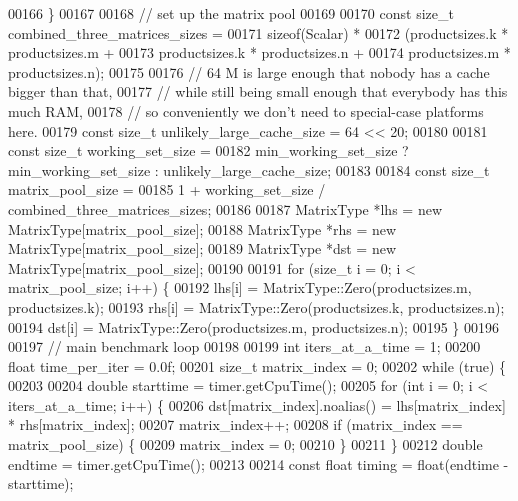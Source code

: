 \begin{DoxyCode}
00166   \}
00167 
00168   \textcolor{comment}{// set up the matrix pool}
00169 
00170   \textcolor{keyword}{const} \textcolor{keywordtype}{size\_t} combined\_three\_matrices\_sizes =
00171     \textcolor{keyword}{sizeof}(Scalar) *
00172       (productsizes.k * productsizes.m +
00173        productsizes.k * productsizes.n +
00174        productsizes.m * productsizes.n);
00175 
00176   \textcolor{comment}{// 64 M is large enough that nobody has a cache bigger than that,}
00177   \textcolor{comment}{// while still being small enough that everybody has this much RAM,}
00178   \textcolor{comment}{// so conveniently we don't need to special-case platforms here.}
00179   \textcolor{keyword}{const} \textcolor{keywordtype}{size\_t} unlikely\_large\_cache\_size = 64 << 20;
00180 
00181   \textcolor{keyword}{const} \textcolor{keywordtype}{size\_t} working\_set\_size =
00182     min\_working\_set\_size ? min\_working\_set\_size : unlikely\_large\_cache\_size;
00183 
00184   \textcolor{keyword}{const} \textcolor{keywordtype}{size\_t} matrix\_pool\_size =
00185     1 + working\_set\_size / combined\_three\_matrices\_sizes;
00186 
00187   MatrixType *lhs = \textcolor{keyword}{new} MatrixType[matrix\_pool\_size];
00188   MatrixType *rhs = \textcolor{keyword}{new} MatrixType[matrix\_pool\_size];
00189   MatrixType *dst = \textcolor{keyword}{new} MatrixType[matrix\_pool\_size];
00190   
00191   \textcolor{keywordflow}{for} (\textcolor{keywordtype}{size\_t} i = 0; i < matrix\_pool\_size; i++) \{
00192     lhs[i] = MatrixType::Zero(productsizes.m, productsizes.k);
00193     rhs[i] = MatrixType::Zero(productsizes.k, productsizes.n);
00194     dst[i] = MatrixType::Zero(productsizes.m, productsizes.n);
00195   \}
00196 
00197   \textcolor{comment}{// main benchmark loop}
00198 
00199   \textcolor{keywordtype}{int} iters\_at\_a\_time = 1;
00200   \textcolor{keywordtype}{float} time\_per\_iter = 0.0f;
00201   \textcolor{keywordtype}{size\_t} matrix\_index = 0;
00202   \textcolor{keywordflow}{while} (\textcolor{keyword}{true}) \{
00203 
00204     \textcolor{keywordtype}{double} starttime = timer.getCpuTime();
00205     \textcolor{keywordflow}{for} (\textcolor{keywordtype}{int} i = 0; i < iters\_at\_a\_time; i++) \{
00206       dst[matrix\_index].noalias() = lhs[matrix\_index] * rhs[matrix\_index];
00207       matrix\_index++;
00208       \textcolor{keywordflow}{if} (matrix\_index == matrix\_pool\_size) \{
00209         matrix\_index = 0;
00210       \}
00211     \}
00212     \textcolor{keywordtype}{double} endtime = timer.getCpuTime();
00213 
00214     \textcolor{keyword}{const} \textcolor{keywordtype}{float} timing = float(endtime - starttime);

\end{DoxyCode}
